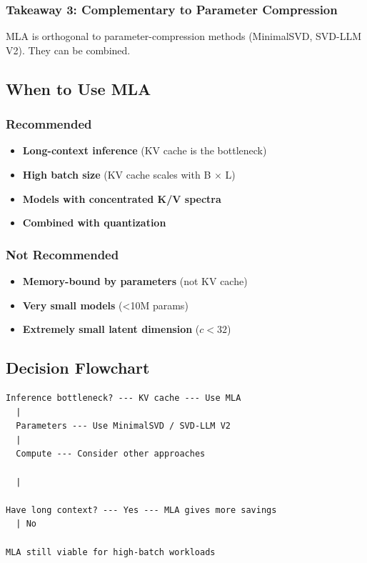 \subsubsection{Takeaway 3: Complementary to Parameter Compression}

MLA is orthogonal to parameter-compression methods (MinimalSVD, SVD-LLM V2). 
They can be combined.

\subsection{When to Use MLA}

\subsubsection{Recommended}

\begin{itemize}
\item \textbf{Long-context inference} (KV cache is the bottleneck)
\item \textbf{High batch size} (KV cache scales with B $\times$ L)
\item \textbf{Models with concentrated K/V spectra}
\item \textbf{Combined with quantization}

\end{itemize}
\subsubsection{Not Recommended}

\begin{itemize}
\item \textbf{Memory-bound by parameters} (not KV cache)
\item \textbf{Very small models} (\textless{}10M params)
\item \textbf{Extremely small latent dimension} ($c < 32$)

\end{itemize}
\subsection{Decision Flowchart}

\begin{lstlisting}
Inference bottleneck? --- KV cache --- Use MLA
  |
  Parameters --- Use MinimalSVD / SVD-LLM V2
  |
  Compute --- Consider other approaches

  |
   
Have long context? --- Yes --- MLA gives more savings
  | No
   
MLA still viable for high-batch workloads
\end{lstlisting}

